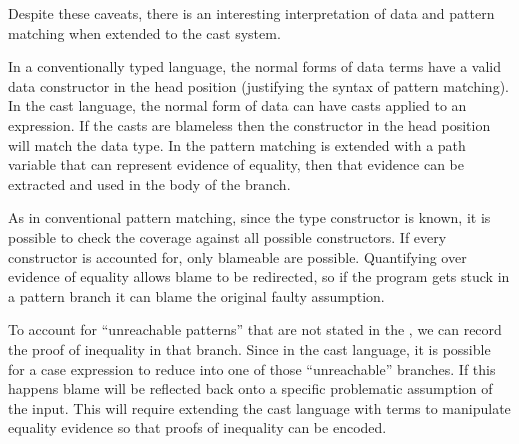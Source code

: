 Despite these caveats, there is an interesting interpretation of data and pattern matching when extended to the cast system.

In a conventionally typed language, the normal forms of data terms have a valid data constructor in the head position (justifying the syntax of pattern matching).
In the cast language, the normal form of data can have casts applied to an expression.
If the casts are blameless then the constructor in the head position will match the data type.
In the \clang{} pattern matching is extended with a path variable that can represent evidence of equality, then that evidence can be extracted and used in the body of the branch.

As in conventional pattern matching, since the type constructor is known, it is possible to check the coverage against all possible constructors.
If every constructor is accounted for, only blameable \scruts{} are possible.
Quantifying over evidence of equality allows blame to be redirected, so if the program gets stuck in a pattern branch it can blame the original faulty assumption.

To account for ``unreachable patterns'' that are not stated in the \slang, we can record the proof of inequality in that branch.
Since in the cast language, it is possible for a case expression to reduce into one of those ``unreachable'' branches.
If this happens blame will be reflected back onto a specific problematic assumption of the input.
This will require extending the cast language with terms to manipulate equality evidence so that proofs of inequality can be encoded.
 









% 


